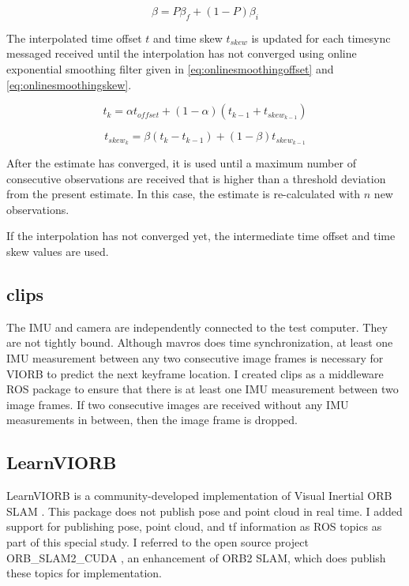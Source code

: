 \begin{equation} \label{eq:sigmoidbeta}
\beta = P  \beta_f + (1 - P)  \beta_i
\end{equation}

The interpolated time offset $t$ and time skew $t_{skew}$ is updated for each timesync messaged received until the interpolation has not converged using online exponential smoothing filter given in \ref{eq:onlinesmoothingoffset} and \ref{eq:onlinesmoothingskew}.

\begin{equation} \label{eq:onlinesmoothingoffset}
t_{k} = \alpha  t_{offset}  + (1 - \alpha)  (t_{k-1} + t_{skew_{k-1}})
\end{equation}

\begin{equation} \label{eq:onlinesmoothingskew}
t_{skew_k} = \beta  (t_k - t_{k-1}) + (1 - \beta)  t_{skew_{k-1}} 
\end{equation}

After the estimate has converged, it is used until a maximum number of consecutive observations are received that is higher than a threshold deviation from the present estimate. In this case, the estimate is re-calculated with $n$ new observations.

If the interpolation has not converged yet, the intermediate time offset and time skew values are used.


\subsection{clips}
The IMU and camera are independently connected to the test computer. They are not tightly bound. Although mavros does time synchronization, at least one IMU measurement between any two consecutive image frames is necessary for VIORB to predict the next keyframe location. 
I created clips as a middleware ROS package to ensure that there is at least one IMU measurement between two image frames. If two consecutive images are received without any IMU measurements in between, then the image frame is dropped.

\subsection{LearnVIORB}
LearnVIORB \cite{learnviorb} is a community-developed implementation of Visual Inertial ORB SLAM . This package does not publish pose and point cloud in real time. I added support for publishing pose, point cloud, and tf information as ROS topics as part of this special study. 
I referred to the open source project ORB\_SLAM2\_CUDA \cite{orbcuda}, an enhancement of ORB2 SLAM, which does publish these topics for implementation.

